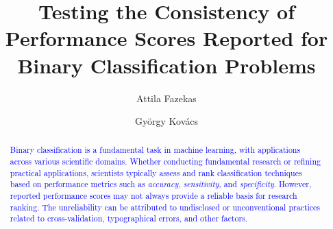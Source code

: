 \documentclass[3p, times]{elsarticle}
\begin{document}
\begin{frontmatter}




\title{Testing the Consistency of Performance Scores Reported for Binary Classification Problems}


\author[1]{Attila Fazekas} 

\author[2]{Gy\"orgy Kov\'acs}



\begin{abstract}
\textcolor{blue}{
Binary classification is a fundamental task in machine learning, with applications across various scientific domains. Whether conducting fundamental research or refining practical applications, scientists typically assess and rank classification techniques based on performance metrics such as \emph{accuracy}, \emph{sensitivity}, and \emph{specificity}. However, reported performance scores may not always provide a reliable basis for research ranking. The unreliability can be attributed to undisclosed or unconventional practices related to cross-validation, typographical errors, and other factors.}


\end{abstract}
\end{frontmatter}
\end{document}
